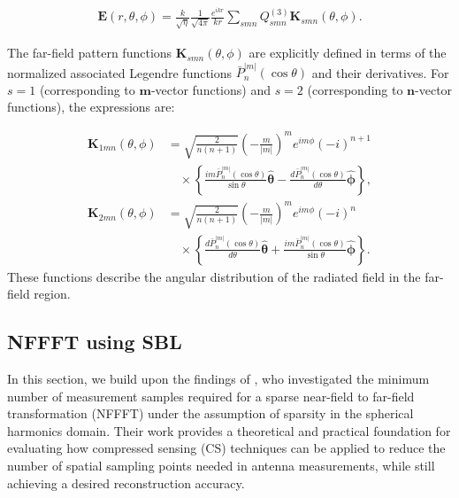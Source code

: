 \documentclass{article}
\begin{document}
\begin{align}
    \mathbf{E}(r,\theta,\phi) = \frac{k}{\sqrt{\eta}} \frac{1}{\sqrt{4\pi}} \frac{e^{ikr}}{kr} \sum_{smn} Q_{smn}^{(3)} \mathbf{K}_{smn}(\theta,\phi).
\end{align}

The far-field pattern functions $\mathbf{K}_{smn}(\theta,\phi)$ are explicitly defined in terms of the normalized associated Legendre functions $\bar{P}_n^{|m|}(\cos\theta)$ and their derivatives. For $s=1$ (corresponding to $\mathbf{m}$-vector functions) and $s=2$ (corresponding to $\mathbf{n}$-vector functions), the expressions are:

\begin{align}
    \mathbf{K}_{1mn}(\theta,\phi) &= \sqrt{\frac{2}{n(n+1)}} \left(-\frac{m}{|m|}\right)^m e^{im\phi} (-i)^{n+1} \\
    &\quad \times \left\{ \frac{im \bar{P}_n^{|m|}(\cos\theta)}{\sin\theta} \boldsymbol{\hat{\theta}} - \frac{d\bar{P}_n^{|m|}(\cos\theta)}{d\theta} \boldsymbol{\hat{\phi}} \right\}, \\
    \mathbf{K}_{2mn}(\theta,\phi) &= \sqrt{\frac{2}{n(n+1)}} \left(-\frac{m}{|m|}\right)^m e^{im\phi} (-i)^n \\
    &\quad \times \left\{ \frac{d\bar{P}_n^{|m|}(\cos\theta)}{d\theta} \boldsymbol{\hat{\theta}} + \frac{im \bar{P}_n^{|m|}(\cos\theta)}{\sin\theta} \boldsymbol{\hat{\phi}} \right\}.
\end{align}
These functions describe the angular distribution of the radiated field in the far-field region.


\subsection{NFFFT using SBL}
In this section, we build upon the findings of \citet{Hofmann2019minimum}, who investigated the minimum number of measurement samples required for a sparse near-field to far-field transformation (NFFFT) under the assumption of sparsity in the spherical harmonics domain. Their work provides a theoretical and practical foundation for evaluating how compressed sensing (CS) techniques can be applied to reduce the number of spatial sampling points needed in antenna measurements, while still achieving a desired reconstruction accuracy.
\end{document}
